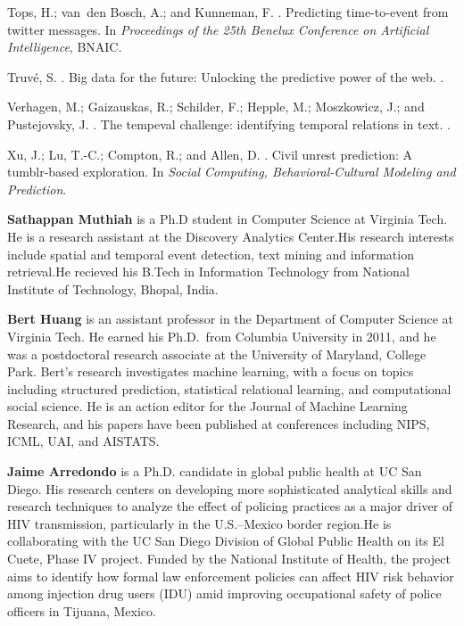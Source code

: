 \documentclass[letterpaper]{article}
\begin{document}
\begin{thebibliography}{}
Tops, H.; van~den Bosch, A.; and Kunneman, F.
.
\newblock Predicting time-to-event from twitter messages.
\newblock In {\em Proceedings of the 25th Benelux Conference on Artificial
  Intelligence}, BNAIC.

Truv{\'e}, S.
.
\newblock Big data for the future: Unlocking the predictive power of the web.
.

Verhagen, M.; Gaizauskas, R.; Schilder, F.; Hepple, M.; Moszkowicz, J.; and
  Pustejovsky, J.
.
\newblock The tempeval challenge: identifying temporal relations in text.
.

Xu, J.; Lu, T.-C.; Compton, R.; and Allen, D.
.
\newblock Civil unrest prediction: A tumblr-based exploration.
\newblock In {\em Social Computing, Behavioral-Cultural Modeling and
  Prediction}.

\end{thebibliography}

{\bf Sathappan Muthiah} is a Ph.D student in Computer Science at
Virginia Tech. He is a research assistant at the Discovery Analytics
Center.His research interests include spatial and temporal event
detection, text mining and information retrieval.He recieved his B.Tech
in Information Technology from National Institute of Technology, Bhopal,
India.

{\bf Bert Huang} is an assistant professor in the Department of Computer
Science at Virginia Tech. He earned his Ph.D.~from Columbia University
in 2011, and he was a postdoctoral research associate at the University
of Maryland, College Park. Bert’s research investigates machine
learning, with a focus on topics including structured prediction,
statistical relational learning, and computational social science. He is
an action editor for the Journal of Machine Learning Research, and his
papers have been published at conferences including NIPS, ICML, UAI, and
AISTATS.

{\bf Jaime Arredondo} is a Ph.D. candidate in global public health at UC San
Diego. His research centers on developing more sophisticated analytical
skills and research techniques to analyze the effect of policing
practices as a major driver of HIV transmission, particularly in the
U.S.–Mexico border region.He is collaborating with the UC San Diego Division of Global
Public Health on its El Cuete, Phase IV project. Funded by the National
Institute of Health, the project aims to identify how formal law
enforcement policies can affect HIV risk behavior among injection drug
users (IDU) amid improving occupational safety of police officers in
Tijuana, Mexico.
\end{document}
